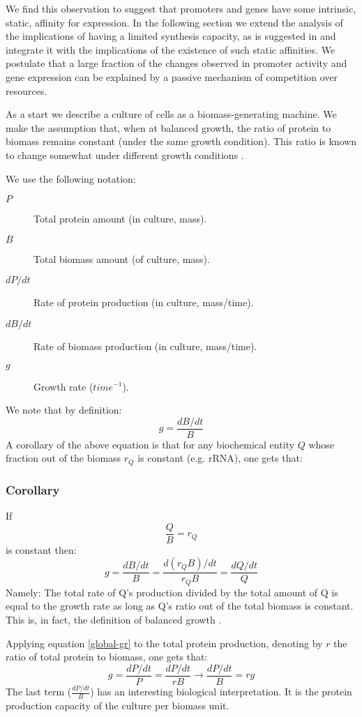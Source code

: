 \documentclass{report}
\begin{document}
We find this observation to suggest that promoters and genes have some intrinsic, static, affinity for expression.
In the following section we extend the analysis of the implications of having a limited synthesis capacity, as is suggested in \cite{Leeat2013} and integrate it with the implications of the existence of such static affinities.
We postulate that a large fraction of the changes observed in promoter activity and gene expression can be explained by a passive mechanism of competition over resources.

As a start we describe a culture of cells as a biomass-generating machine.
We make the assumption that, when at balanced growth, the ratio of protein to biomass remains constant (under the same growth condition).
This ratio is known to change somewhat under different growth conditions \cite{Bremer1987}.

We use the following notation:
\begin{description}
\item[$P$] Total protein amount (in culture, mass).
\item[$B$] Total biomass amount (of culture, mass).
\item [$dP/dt$] Rate of protein production (in culture, mass/time).
\item [$dB/dt$] Rate of biomass production (in culture, mass/time).
\item [$g$] Growth rate ($time^{-1}$).
\end{description}
We note that by definition:
\[ g=\frac{dB/dt}{B}\]
A corollary of the above equation is that for any biochemical entity $Q$ whose fraction out of the biomass $r_Q$ is constant (e.g. rRNA), one gets that:
\subsubsection{Corollary}
If
\[\frac{Q}{B}=r_Q\]
is constant then:
\begin{equation}
\label{global-gr}
g=\frac{dB/dt}{B}=\frac{d(r_QB)/dt}{r_QB}=\frac{dQ/dt}{Q}
\end{equation}
Namely: The total rate of Q's production divided by the total amount of Q is equal to the growth rate as long as Q's ratio out of the total biomass is constant.
This is, in fact, the definition of balanced growth \cite{Campbell1957}.

Applying equation \ref{global-gr} to the total protein production, denoting by $r$ the ratio of total protein to biomass, one gets that:
\[g=\frac{dP/dt}{P}=\frac{dP/dt}{rB}\rightarrow\frac{dP/dt}{B}=rg\]
The last term ($\frac{dP/dt}{B}$) has an interesting biological interpretation.
It is the protein production capacity of the culture per biomass unit.
\end{document}
